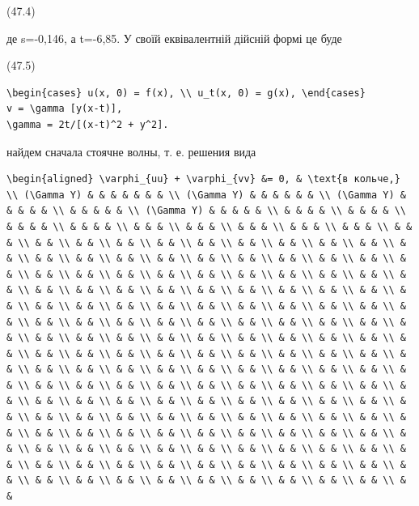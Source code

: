 \documentclass[
  ukrainian,
]{article}
\begin{document}
(47.4)

де s=-0,146, а t=-6,85. У своїй еквівалентній дійсній формі це буде

(47.5)

\begin{verbatim}
\begin{cases} u(x, 0) = f(x), \\ u_t(x, 0) = g(x), \end{cases}
v = \gamma [y(x-t)],
\gamma = 2t/[(x-t)^2 + y^2].
\end{verbatim}

найдем сначала стоячне волны, т. е. решения вида

\begin{verbatim}
\begin{aligned} \varphi_{uu} + \varphi_{vv} &= 0, & \text{в кольче,} \\ (\Gamma Y) & & & & & & & \\ (\Gamma Y) & & & & & & \\ (\Gamma Y) & & & & & \\ & & & & & \\ (\Gamma Y) & & & & & \\ & & & & \\ & & & & \\ & & & & \\ & & & & \\ & & & \\ & & & \\ & & & \\ & & & \\ & & & \\ & & & \\ & & \\ & & \\ & & \\ & & \\ & & \\ & & \\ & & \\ & & \\ & & \\ & & \\ & & \\ & & \\ & & \\ & & \\ & & \\ & & \\ & & \\ & & \\ & & \\ & & \\ & & \\ & & \\ & & \\ & & \\ & & \\ & & \\ & & \\ & & \\ & & \\ & & \\ & & \\ & & \\ & & \\ & & \\ & & \\ & & \\ & & \\ & & \\ & & \\ & & \\ & & \\ & & \\ & & \\ & & \\ & & \\ & & \\ & & \\ & & \\ & & \\ & & \\ & & \\ & & \\ & & \\ & & \\ & & \\ & & \\ & & \\ & & \\ & & \\ & & \\ & & \\ & & \\ & & \\ & & \\ & & \\ & & \\ & & \\ & & \\ & & \\ & & \\ & & \\ & & \\ & & \\ & & \\ & & \\ & & \\ & & \\ & & \\ & & \\ & & \\ & & \\ & & \\ & & \\ & & \\ & & \\ & & \\ & & \\ & & \\ & & \\ & & \\ & & \\ & & \\ & & \\ & & \\ & & \\ & & \\ & & \\ & & \\ & & \\ & & \\ & & \\ & & \\ & & \\ & & \\ & & \\ & & \\ & & \\ & & \\ & & \\ & & \\ & & \\ & & \\ & & \\ & & \\ & & \\ & & \\ & & \\ & & \\ & & \\ & & \\ & & \\ & & \\ & & \\ & & \\ & & \\ & & \\ & & \\ & & \\ & & \\ & & \\ & & \\ & & \\ & & \\ & & \\ & & \\ & & \\ & & \\ & & \\ & & \\ & & \\ & & \\ & & \\ & & \\ & & \\ & & \\ & & \\ & & \\ & & \\ & & \\ & & \\ & & \\ & & \\ & & \\ & & \\ & & \\ & & \\ & & \\ & & \\ & & \\ & & 
\end{verbatim}
\end{document}
